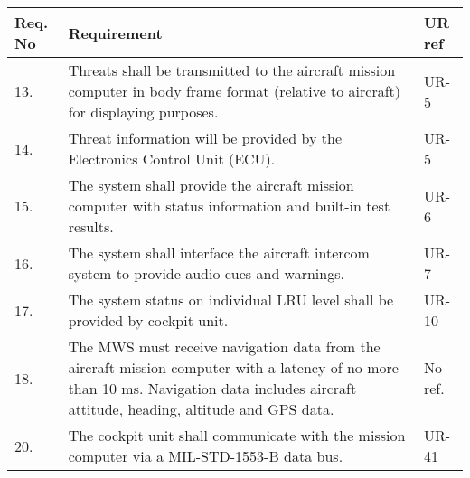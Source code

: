 \begin{center}
    \begin{tabular}{ | l | p{9cm} | l |}
    \hline
    Req. No & Requirement  & UR ref \\ \hline
    13. & Threats shall be transmitted to the aircraft mission computer in body frame format (relative to aircraft) for displaying purposes.  & UR-5 \\ \hline
	14. & Threat information will be provided by the Electronics Control Unit (ECU).  & UR-5 \\ \hline
	15. & The system shall provide the aircraft mission computer with status information and built-in test results.  & UR-6 \\ \hline
	16. & The system shall interface the aircraft intercom system to provide audio cues and warnings.  & UR-7 \\ \hline
	17. & The system status on individual LRU level shall be provided by cockpit unit. & UR-10 \\ \hline
	18. & The MWS must receive navigation data from the aircraft mission computer with a latency of no more than 10 ms.
	Navigation data includes aircraft attitude, heading, altitude and GPS data. & No ref. \\ \hline
	20. & The cockpit unit shall communicate with the mission computer via a MIL-STD-1553-B data bus. & UR-41 \\ \hline	
    \end{tabular}
\end{center} 